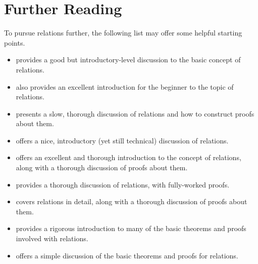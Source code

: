 \documentclass[../../../main.tex]{subfiles}
\begin{document}
\chapter{Further Reading}

To pursue relations further, the following list may offer some helpful starting points.

\begin{itemize}

  \item \citet[ch.~4]{StewartAndTall2015} provides a good but introductory-level discussion to the basic concept of relations.
  
  \item \citet[ch.~2]{Steinhart2018} also provides an excellent introduction for the beginner to the topic of relations.
  
  \item \citet[ch.~9]{Cummings2020} presents a slow, thorough discussion of relations and how to construct proofs about them.
  
  \item \citet[ch.~2]{Zach2019} offers a nice, introductory (yet still technical) discussion of relations.

  \item \citet[ch.~4]{Velleman2019} offers an excellent and thorough introduction to the concept of relations, along with a thorough discussion of proofs about them.
  
  \item \citet[ch.~3]{Warner2019} provides a thorough discussion of relations, with fully-worked proofs.
  
  \item \citet[ch.~10]{MaddenAndAubrey2017} covers relations in detail, along with a thorough discussion of proofs about them.

  \item \citet[ch.~6]{Jongsma2019} provides a rigorous introduction to many of the basic theorems and proofs involved with relations.
  
  \item \citet[ch.~3]{Pinter2014} offers a simple discussion of the basic theorems and proofs for relations.

\end{itemize}
\end{document}
